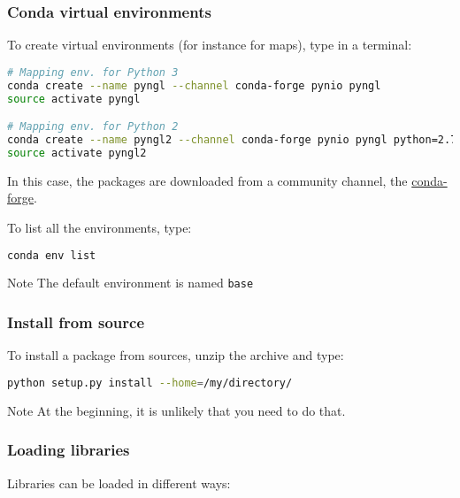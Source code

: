 \begin{frame}[fragile]
\frametitle{Conda virtual environments}

To create virtual environments (for instance for maps), type in a terminal:

\begin{lstlisting}[language=bash]
# Mapping env. for Python 3
conda create --name pyngl --channel conda-forge pynio pyngl
source activate pyngl

# Mapping env. for Python 2
conda create --name pyngl2 --channel conda-forge pynio pyngl python=2.7
source activate pyngl2
\end{lstlisting}

In this case, the packages are downloaded from a community channel, the \href{https://conda-forge.org/}{conda-forge}.\\
\vspace{1em}

To list all the environments, type: 

\begin{lstlisting}[language=bash, basicstyle=\ttfamily\scriptsize] 
conda env list
\end{lstlisting}

\begin{block}{Note}
The default environment is named \verb+base+
\end{block} 

\end{frame}

\begin{frame}[fragile]
    \frametitle{Install from source}

    To install a package from sources, unzip the archive and type:
    \begin{lstlisting}[language=bash, basicstyle=\ttfamily\scriptsize] 
python setup.py install --home=/my/directory/
    \end{lstlisting}

    \begin{block}{Note}
At the beginning, it is unlikely that you need to do that.
    \end{block}

\end{frame}

\begin{frame}
    \frametitle{Loading libraries}
    Libraries can be loaded in different ways:
    
\end{frame}

